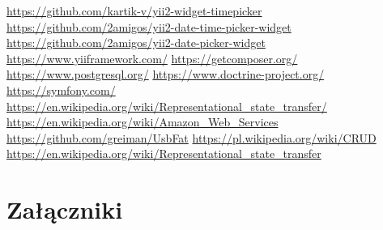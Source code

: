 \documentclass[declaration,shortabstract, mgr]{iithesis}
\begin{document}
\begin{thebibliography}{9}
		\url{https://github.com/kartik-v/yii2-widget-timepicker}	
		\url{https://github.com/2amigos/yii2-date-time-picker-widget}	
		\url{https://github.com/2amigos/yii2-date-picker-widget}	
		\url{https://www.yiiframework.com/}
		\url{https://getcomposer.org/}	
		\url{https://www.postgresql.org/}
		\url{https://www.doctrine-project.org/}
		\url{https://symfony.com/}	
		\url{https://en.wikipedia.org/wiki/Representational_state_transfer/}
		\url{https://en.wikipedia.org/wiki/Amazon_Web_Services}	
		\url{https://github.com/greiman/UsbFat}
		\url{https://pl.wikipedia.org/wiki/CRUD}	
		\url{https://en.wikipedia.org/wiki/Representational_state_transfer}	
		
		
		
\end{thebibliography}

\appendix
\chapter{Załączniki}
\end{document}
